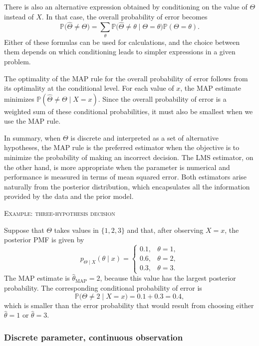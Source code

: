 There is also an alternative expression obtained by conditioning on the value of \(\Theta\) instead of \(X\).  
In that case, the overall probability of error becomes
\[
\mathbb{P}\big(\hat{\Theta} \neq \Theta\big)
=
\sum_{\theta}
\mathbb{P}\big(\hat{\Theta} \neq \theta \mid \Theta = \theta\big)
\mathbb{P}(\Theta = \theta).
\]
Either of these formulas can be used for calculations, and the choice between them depends on which conditioning leads to simpler expressions in a given problem.  

The optimality of the MAP rule for the overall probability of error follows from its optimality at the conditional level.  
For each value of \(x\), the MAP estimate minimizes \(\mathbb{P}(\hat{\Theta} \neq \Theta \mid X = x)\).  
Since the overall probability of error is a weighted sum of these conditional probabilities, it must also be smallest when we use the MAP rule.  

In summary, when \(\Theta\) is discrete and interpreted as a set of alternative hypotheses, the MAP rule is the preferred estimator when the objective is to minimize the probability of making an incorrect decision.  
The LMS estimator, on the other hand, is more appropriate when the parameter is numerical and performance is measured in terms of mean squared error.  
Both estimators arise naturally from the posterior distribution, which encapsulates all the information provided by the data and the prior model.

\bigskip
\textsc{Example: three-hypothesis decision}

Suppose that \(\Theta\) takes values in \(\{1,2,3\}\) and that, after observing \(X = x\), the posterior PMF is given by
\[
p_{\Theta \mid X}(\theta \mid x)
=
\begin{cases}
0.1, & \theta = 1,\\
0.6, & \theta = 2,\\
0.3, & \theta = 3.
\end{cases}
\]
The MAP estimate is \(\hat{\theta}_{\text{MAP}} = 2\), because this value has the largest posterior probability.  
The corresponding conditional probability of error is
\[
\mathbb{P}\big(\Theta \neq 2 \mid X = x\big)
=
0.1 + 0.3
=
0.4,
\]
which is smaller than the error probability that would result from choosing either \(\hat{\theta} = 1\) or \(\hat{\theta} = 3\).


\newpage
\subsubsection{Discrete parameter, continuous observation}

